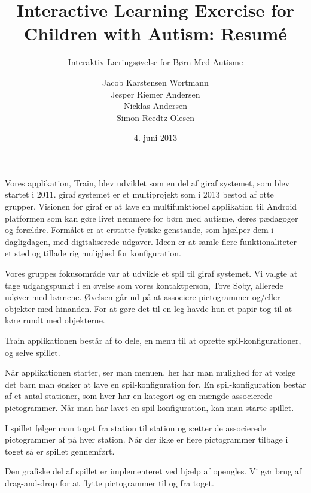 \documentclass[10pt]{article}
\title{Interactive Learning Exercise for Children with Autism: Resumé}
\subtitle{Interaktiv Læringsøvelse for Børn Med Autisme}
\author{Jacob Karstensen Wortmann\\Jesper Riemer Andersen\\Nicklas Andersen\\Simon Reedtz Olesen}
\date{4. juni 2013}
\begin{document}
\maketitle

Vores applikation, Train, blev udviklet som en del af \ac{giraf} systemet, som blev startet i 2011. \ac{giraf} systemet er et multiprojekt som i 2013 bestod af otte grupper. Visionen for \ac{giraf} er at lave en multifunktionel applikation til Android platformen som kan gøre livet nemmere for børn med autisme, deres pædagoger og forældre. Formålet er at erstatte fysiske genstande, som hjælper dem i dagligdagen, med digitaliserede udgaver. Ideen er at samle flere funktionaliteter et sted og tillade rig mulighed for konfiguration.

Vores gruppes fokusområde var at udvikle et spil til \ac{giraf} systemet. Vi valgte at tage udgangspunkt i en øvelse som vores kontaktperson, Tove Søby, allerede udøver med børnene. Øvelsen går ud på at associere pictogrammer og/eller objekter med hinanden. For at gøre det til en leg havde hun et papir-tog til at køre rundt med objekterne.

Train applikationen består af to dele, en menu til at oprette spil-konfigurationer, og selve spillet. 

Når applikationen starter, ser man menuen, her har man mulighed for at vælge det barn man ønsker at lave en spil-konfiguration for. En spil-konfiguration består af et antal stationer, som hver har en kategori og en mængde associerede pictogrammer. Når man har lavet en spil-konfiguration, kan man starte spillet.

I spillet følger man toget fra station til station og sætter de associerede pictogrammer af på hver station. Når der ikke er flere pictogrammer tilbage i toget så er spillet gennemført.

Den grafiske del af spillet er implementeret ved hjælp af \acl{opengles}. Vi gør brug af drag-and-drop for at flytte pictogrammer til og fra toget.
\end{document}
